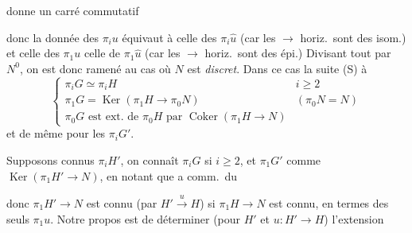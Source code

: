 \documentclass[11pt,a4paper]{article}
\begin{document}
donne un carré commutatif



donc la donnée des $\pi_i u$ équivaut à celle des $\pi_i \hat{u}$ (car les
$\to$ horiz.\ sont des isom.) et celle des $\pi_1 u$ 
 celle de $\pi_1 \hat{u}$ (car les $\to$ horiz.\ sont des
épi.)  Divisant tout par $N^0$, on est donc ramené au cas
où $N$ est \emph{discret}. Dans ce cas la suite (S)  à
\struck{\ill{}}
\[
  \left\{ \begin{array}{ll}
    \pi_i G \simeq \pi_i H & i \geqslant 2 \\
    \pi_1 G = \operatorname{Ker}(\pi_1 H \to \pi_0 N) & (\pi_0 N = N) \\
    \pi_0 G \text{ est ext.\ de } \pi_0 H \text{ par } \operatorname{Coker}(\pi_1 H \to N)
  \end{array} \right.
\]
et de même pour les $\pi_i G'$. 

Supposons connus \struck{\ill{}} $\pi_i H'$, on connaît 
$\pi_i G$ si $i \geqslant 2$, et $\pi_1 G'$ comme
$\operatorname{Ker}(\pi_1 H' \to N)$, en notant que 
\ill{} a comm.\ du


donc $\pi_1 H' \to N$ est connu (par $H' \xrightarrow{u} H$) si
$\pi_1 H \to N$ est connu, en termes des seuls $\pi_1 u$. Notre propos est
  de déterminer (pour $H'$ et
$u : H' \to H$) l'extension
\end{document}
